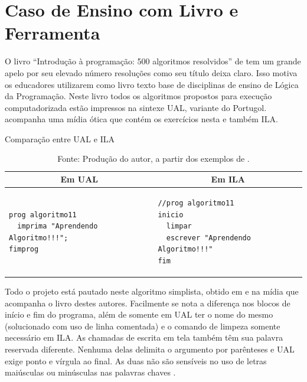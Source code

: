 \section{Caso de Ensino com Livro e Ferramenta}

O livro ``Introdução à programação: 500 algoritmos resolvidos'' de  tem um grande apelo por seu elevado número resoluções como seu título deixa claro. Isso motiva os educadores utilizarem como livro texto base de disciplinas de ensino de Lógica da Programação. Neste livro todos os algoritmos propostos para execução computadorizada estão impressos na sintexe UAL, variante do Portugol. acompanha uma mídia ótica que contém os exercícios nesta e também ILA.

\begin{table}[h]
\centering
  \caption{Comparação entre UAL e ILA}\label{tabela:compare-ualila}
\begin{tabular}{p{75mm} | p{75mm}}\hline
\multicolumn{1}{c|}{\textbf{Em UAL}} & \multicolumn{1}{c}{\textbf{Em ILA}} \\ \hline
\begin{lstlisting}[language=ual,style=table]
prog algoritmo11
  imprima "Aprendendo Algoritmo!!!";
fimprog
\end{lstlisting} &
\begin{lstlisting}[language=ila,style=table]
//prog algoritmo11
inicio
  limpar
  escrever "Aprendendo Algoritmo!!!"
fim
\end{lstlisting} \\ \hline
\end{tabular}
  \caption*{\ifdraft{\color{green}}{}\footnotesize Fonte: Produção do autor, a partir dos exemplos de .}
\end{table}

Todo o projeto está pautado neste algoritmo simplista, obtido em  e na mídia que acompanha o livro destes autores. Facilmente se nota a diferença nos blocos de início e fim do programa, além de somente em UAL ter o nome do mesmo (solucionado com uso de linha comentada) e o comando de limpeza somente necessário em ILA. As chamadas de escrita em tela também têm sua palavra reservada diferente. Nenhuma delas delimita o argumento por parênteses e UAL exige ponto e vírgula ao final. As duas não são sensíveis no uso de letras maiúsculas ou minúsculas nas palavras chaves .

